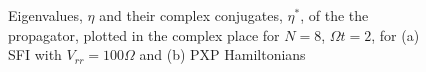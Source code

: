 \begin{figure}
  \centering
  \caption{Eigenvalues, $\eta$ and their complex conjugates, $\eta^*$,
    of the the propagator, plotted in the complex place for $N=8$,
    $\Omega t=2$, for (a) SFI with $V_{rr}=100\Omega$ and (b) PXP
    Hamiltonians}
\end{figure}


